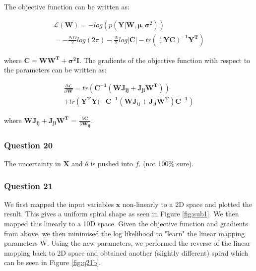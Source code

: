 \documentclass[10pt, a4paper, twocolumn]{article} %
\begin{document}
The objective function can be written as:

\begin{multline}
  \mathcal{L}(\mathbf{W}) = -log(p(\mathbf{Y}|\mathbf{W}, \bm{\mu}, \bm{\sigma}^2)) \\
  = -\frac{ND}{2}log(2\pi) - \frac{N}{2}log|\mathbf{C}| - tr(\mathbf{(YC)^{-1}Y^T})
\end{multline}

where $\mathbf{C} = \mathbf{WW^T} + \bm{\sigma^2}\mathbf{I}$. The gradients of the objective function with respect to the parameters can be written as:

\begin{multline}
  \frac{\partial \mathcal{L}}{\partial \mathbf{W}} = tr(\mathbf{C^{-1}(WJ_{ij} +  J_{ji}W^T)}) \\
  + tr(\mathbf{Y^TY(-C^{-1}(WJ_{ij} +  J_{ji}W^T)C^{-1}})
\end{multline}

where $\mathbf{WJ_{ij} +  J_{ji}W^T}$ = $\frac{\partial \mathbf{C}}{\partial \mathbf{W_{ij}}}$.

\subsubsection*{Question 20}
The uncertainty in $\mathbf{X}$ and $\theta$ is pushed into $f$. (not 100\% sure). 

\subsubsection*{Question 21}

We first mapped the input variables $\mathbf{x}$ non-linearly to a 2D space and plotted the result. This gives a uniform spiral shape as seen in Figure \ref{fig:sub1}. We then mapped this linearly to a 10D space. Given the objective function and gradients from above, we then minimised the log likelihood to "learn" the linear mapping parameters W. Using the new parameters, we performed the reverse of the linear mapping back to 2D space and obtained another (slightly different) spiral which can be seen in Figure \ref{fig:q21b}.
\end{document}
